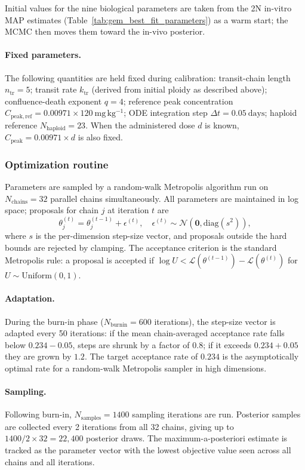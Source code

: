 \documentclass[11pt,notitlepage]{article}
\begin{document}
Initial values for the nine biological parameters are taken from the 2N
in-vitro MAP estimates (Table~\ref{tab:gem_best_fit_parameters}) as a
warm start; the MCMC then moves them toward the in-vivo posterior.

\paragraph{Fixed parameters.}
The following quantities are held fixed during calibration:
transit-chain length $n_{\mathrm{tr}}=5$;
transit rate $k_{\mathrm{tr}}$ (derived from initial ploidy as described above);
confluence-death exponent $q=4$;
reference peak concentration $C_{\mathrm{peak,ref}}=0.00971\times120~\mathrm{mg\,kg^{-1}}$;
ODE integration step $\Delta t=0.05~\mathrm{days}$;
haploid reference $N_{\mathrm{haploid}}=23$.
When the administered dose $d$ is known,
$C_{\mathrm{peak}}=0.00971\times d$ is also fixed.


\subsubsection{Optimization routine}
\label{sec:invivo_optim}

Parameters are sampled by a random-walk Metropolis algorithm run on
$N_{\mathrm{chains}}=32$ parallel chains simultaneously.
All parameters are maintained in log space; proposals for chain $j$ at
iteration $t$ are
\[
\theta_j^{(t)}
=
\theta_j^{(t-1)}+\epsilon^{(t)},
\quad
\epsilon^{(t)}\sim\mathcal{N}\!\left(\mathbf{0},\mathrm{diag}(s^2)\right),
\]
where $s$ is the per-dimension step-size vector, and proposals outside the
hard bounds are rejected by clamping.
The acceptance criterion is the standard Metropolis rule: a proposal is
accepted if
$\log U < \mathcal{L}(\theta^{(t-1)})-\mathcal{L}(\theta^{(t)})$
for $U\sim\mathrm{Uniform}(0,1)$.

\paragraph{Adaptation.}
During the burn-in phase ($N_{\mathrm{burnin}}=600$ iterations), the
step-size vector is adapted every 50 iterations: if the mean
chain-averaged acceptance rate falls below $0.234-0.05$, steps are
shrunk by a factor of $0.8$; if it exceeds $0.234+0.05$ they are grown
by $1.2$.
The target acceptance rate of $0.234$ is the asymptotically optimal rate
for a random-walk Metropolis sampler in high dimensions.

\paragraph{Sampling.}
Following burn-in, $N_{\mathrm{samples}}=1400$ sampling iterations are
run.
Posterior samples are collected every 2 iterations from
all 32 chains, giving up to
$1400/2\times 32=22{,}400$ posterior draws.
The maximum-a-posteriori estimate is tracked as the parameter
vector with the lowest objective value seen across all chains and all
iterations.
\end{document}
